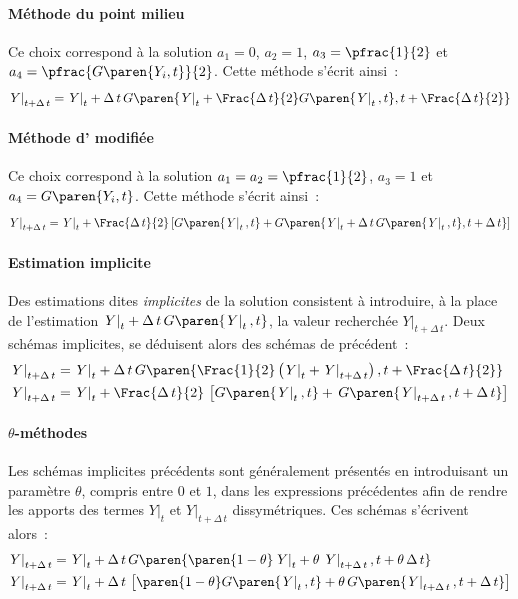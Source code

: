 \documentclass[rectoverso,pleiades,pstricks,leqno,anti]{texmf/note_technique_2010}
\newcommand{\debutpas}[1]{\ensuremath{\left.#1\right|_{t}}}
\newcommand{\finpas}[1]{\ensuremath{\left.#1\right|_{t+\Delta\, t}}}
\begin{document}
\paragraph{Méthode du point milieu} Ce choix correspond à la solution
\(a_{1}=0\), \(a_{2}=1\), \(a_{3}=\pfrac{1}{2}\) et
\(a_{4}=\pfrac{G\paren{Y_{i},t}}{2}\). Cette méthode s'écrit ainsi~:
\[
\finpas{Y} = \debutpas{Y}+\Delta\,t\,G\paren{\debutpas{Y}+\Frac{\Delta\, t}{2}G\paren{\debutpas{Y},t},t+\Frac{\Delta\, t}{2}}
\]

\paragraph{Méthode d' modifiée} Ce choix correspond à la solution
\(a_{1}=a_{2}=\pfrac{1}{2}\), \(a_{3}=1\) et
\(a_{4}=G\paren{Y_{i},t}\). Cette méthode s'écrit ainsi~:
\[
\finpas{Y} = \debutpas{Y}+\Frac{\Delta\,t}{2}\left[G\paren{\debutpas{Y},t}+G\paren{\debutpas{Y}+\Delta\, t\,G\paren{\debutpas{Y},t},t+\Delta\,t }\right]
\]

\paragraph{Estimation implicite}
Des estimations dites {\em implicites} de la solution consistent à
introduire, à la place de l'estimation \(\debutpas{Y}+\Delta\, t\,
G\paren{\debutpas{Y},t}\), la valeur recherchée \(\finpas{Y}\).  Deux
schémas implicites, se déduisent alors des schémas de
 précédent~:
\[
\begin{aligned}
  \finpas{Y}&=\debutpas{Y}+\Delta\,t\,G\paren{\Frac{1}{2}\left(\debutpas{Y}+\finpas{Y}\right),t+\Frac{\Delta\, t}{2}} \\
  \finpas{Y}&=\debutpas{Y}+\Frac{\Delta\,t}{2}\,\left[G\paren{\debutpas{Y},t}
    +\,G\paren{\finpas{Y},t+\Delta\,t}\right] \\
\end{aligned}
\]

\paragraph{\(\theta\)-méthodes}

Les schémas implicites précédents sont généralement présentés en
introduisant un paramètre \(\theta\), compris entre \(0\) et \(1\),
dans les expressions précédentes afin de rendre les apports des termes
\(\debutpas{Y}\) et \(\finpas{Y}\) dissymétriques. Ces schémas
s'écrivent alors~:
\begin{equation}
  \label{eq:implicite}
  \begin{aligned}
    \finpas{Y}&=\debutpas{Y}+\Delta\,t\,G\paren{\paren{1-\theta}\debutpas{Y}+\theta\,\finpas{Y},t+\theta\,\Delta\, t} \\
    \finpas{Y}&=\debutpas{Y}+\Delta\,t\,\left[\paren{1-\theta}G\paren{\debutpas{Y},t}
      +\theta\,G\paren{\finpas{Y},t+\Delta\,t}\right]
  \end{aligned}
\end{equation}
\end{document}
